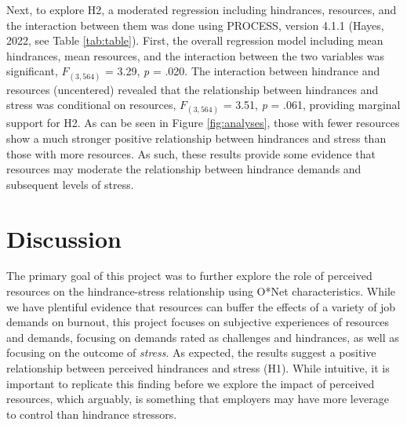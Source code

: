 \documentclass[
  man]{apa6}
\begin{document}
Next, to explore H2, a moderated regression including hindrances, resources, and the interaction between them was done using PROCESS, version 4.1.1 (Hayes, 2022, see Table \ref{tab:table}). First, the overall regression model including mean hindrances, mean resources, and the interaction between the two variables was significant, \(F_{(3, 564)}\) = 3.29, \emph{p} = .020. The interaction between hindrance and resources (uncentered) revealed that the relationship between hindrances and stress was conditional on resources, \(F_{(3, 564)}\) = 3.51, \emph{p} = .061, providing marginal support for H2. As can be seen in Figure \ref{fig:analyses}, those with fewer resources show a much stronger positive relationship between hindrances and stress than those with more resources. As such, these results provide some evidence that resources may moderate the relationship between hindrance demands and subsequent levels of stress.

\hypertarget{discussion}{%
\section{Discussion}\label{discussion}}

The primary goal of this project was to further explore the role of perceived resources on the hindrance-stress relationship using O*Net characteristics. While we have plentiful evidence that resources can buffer the effects of a variety of job demands on burnout, this project focuses on subjective experiences of resources and demands, focusing on demands rated as challenges and hindrances, as well as focusing on the outcome of \emph{stress}. As expected, the results suggest a positive relationship between perceived hindrances and stress (H1). While intuitive, it is important to replicate this finding before we explore the impact of perceived resources, which arguably, is something that employers may have more leverage to control than hindrance stressors.
\end{document}
